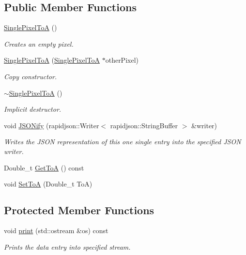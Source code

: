 \subsection*{Public Member Functions}
\begin{DoxyCompactItemize}
\item 
\hyperlink{classSinglePixelToA_a14b5fa35ac80341c180ee2948b0d533a}{Single\+Pixel\+To\+A} ()
\begin{DoxyCompactList}\small\item\em Creates an empty pixel. \end{DoxyCompactList}\item 
\hyperlink{classSinglePixelToA_a848f55b6ef644f7b61a276aa0ec5c479}{Single\+Pixel\+To\+A} (\hyperlink{classSinglePixelToA}{Single\+Pixel\+To\+A} $\ast$other\+Pixel)
\begin{DoxyCompactList}\small\item\em Copy constructor. \end{DoxyCompactList}\item 
\hyperlink{classSinglePixelToA_a976faa699430463edccf827d7686f941}{$\sim$\+Single\+Pixel\+To\+A} ()
\begin{DoxyCompactList}\small\item\em Implicit destructor. \end{DoxyCompactList}\item 
void \hyperlink{classSinglePixelToA_afef10aa4fe0b3c4d1676ada1d8ee4195}{J\+S\+O\+Nify} (rapidjson\+::\+Writer$<$ rapidjson\+::\+String\+Buffer $>$ \&writer)
\begin{DoxyCompactList}\small\item\em Writes the J\+S\+O\+N representation of this one single entry into the specified J\+S\+O\+N writer. \end{DoxyCompactList}\item 
Double\+\_\+t \hyperlink{classSinglePixelToA_ac63323a38df82131599539bf412e5c4e}{Get\+To\+A} () const 
\item 
void \hyperlink{classSinglePixelToA_a7c3836057703bd042c89997e3490d3d9}{Set\+To\+A} (Double\+\_\+t To\+A)
\end{DoxyCompactItemize}
\subsection*{Protected Member Functions}
\begin{DoxyCompactItemize}
\item 
void \hyperlink{classSinglePixelToA_a8c38cf1022b32a2fd3bb8aea07269b02}{print} (std\+::ostream \&os) const 
\begin{DoxyCompactList}\small\item\em Prints the data entry into specified stream. \end{DoxyCompactList}\end{DoxyCompactItemize}


